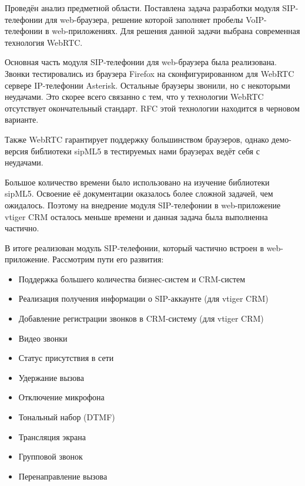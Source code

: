 \conclusion
Проведён анализ предметной области. Поставлена задача разработки модуля SIP-телефонии для web-браузера, решение которой заполняет пробелы VoIP-телефонии в web-приложениях. Для решения данной задачи выбрана современная технология WebRTC.

Основная часть модуля SIP-телефонии для web-браузера была реализована. Звонки тестировались из браузера Firefox на сконфигурированном для WebRTC сервере IP-телефонии Asterisk. Остальные браузеры звонили, но с некоторыми неудачами. Это скорее всего связанно с тем, что у технологии WebRTC отсутствует окончательный стандарт. RFC этой технологии находится в черновом варианте.

Также WebRTC гарантирует поддержку большинством браузеров, однако демо-версия библиотеки sipML5 в тестируемых нами браузерах ведёт себя с неудачами.

Большое количество времени было использовано на изучение библиотеки sipML5. Освоение её документации оказалось более сложной задачей, чем ожидалось. Поэтому на внедрение модуля SIP-телефонии в web-приложение vtiger CRM осталось меньше времени и данная задача была выполненна частично.

В итоге реализован модуль SIP-телефонии, который частично встроен в web-приложение. Рассмотрим пути его развития:
\begin{itemize}
\item Поддержка большего количества бизнес-систем и CRM-систем
\item Реализация получения информации о SIP-аккаунте (для vtiger CRM)
\item Добавление регистрации звонков в CRM-систему (для vtiger CRM)
\item Видео звонки
\item Статус присутствия в сети
\item Удержание вызова
\item Отключение микрофона
\item Тональный набор (DTMF)
\item Трансляция экрана
\item Групповой звонок
\item Перенаправление вызова
\end{itemize}
